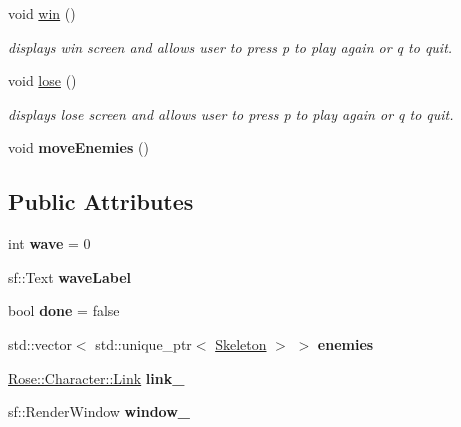 \begin{DoxyCompactItemize}
void \mbox{\hyperlink{classGame_a4d95b74e7496c0be1c829af66bf1f9f5}{win}} ()
\begin{DoxyCompactList}\small\item\em displays win screen and allows user to press p to play again or q to quit. \end{DoxyCompactList}\item 
\mbox{\label{classGame_a83ccbec9f423d3035b024184d1ff80c9}} 
void \mbox{\hyperlink{classGame_a83ccbec9f423d3035b024184d1ff80c9}{lose}} ()
\begin{DoxyCompactList}\small\item\em displays lose screen and allows user to press p to play again or q to quit. \end{DoxyCompactList}\item 
\mbox{\label{classGame_a5a2ab72063d3d3f01c71b4318c840128}} 
void {\bfseries move\+Enemies} ()
\end{DoxyCompactItemize}
\subsection*{Public Attributes}
\begin{DoxyCompactItemize}
\item 
\mbox{\label{classGame_acf2f285294fa7afaaecc38b9900dfa05}} 
int {\bfseries wave} = 0
\item 
\mbox{\label{classGame_a6ddb0bfea798aa7a561f2e5a2e97234e}} 
sf\+::\+Text {\bfseries wave\+Label}
\item 
\mbox{\label{classGame_a75fbaca88268efde270cdccd44be8ce4}} 
bool {\bfseries done} = false
\item 
\mbox{\label{classGame_a7d383b1aaa581b920bb1e755fa183053}} 
std\+::vector$<$ std\+::unique\+\_\+ptr$<$ \mbox{\hyperlink{classSkeleton}{Skeleton}} $>$ $>$ {\bfseries enemies}
\item 
\mbox{\label{classGame_a696ebd6aed1596f45406ebc18bccf2c7}} 
\mbox{\hyperlink{classRose_1_1Character_1_1Link}{Rose\+::\+Character\+::\+Link}} {\bfseries link\+\_\+}
\item 
\mbox{\label{classGame_a5ad8d824f754300de05b9fc994d9c52e}} 
sf\+::\+Render\+Window {\bfseries window\+\_\+}
\end{DoxyCompactItemize}


